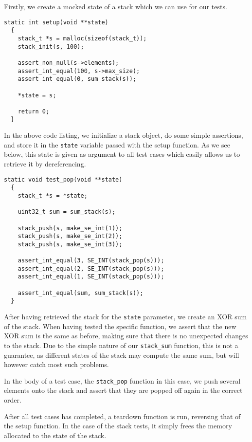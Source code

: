 Firstly, we create a mocked state of a stack which we can use for our tests.

\begin{lstlisting}[language={[ANSI]C},caption={Unit-test setup procedure}]
  static int setup(void **state)
  {
    stack_t *s = malloc(sizeof(stack_t));
    stack_init(s, 100);

    assert_non_null(s->elements);
    assert_int_equal(100, s->max_size);
    assert_int_equal(0, sum_stack(s));

    *state = s;

    return 0;
  }
\end{lstlisting}

In the above code listing, we initialize a stack object, do some simple
assertions, and store it in the {\tt state} variable passed with the setup
function. As we see below, this state is given as argument to all test cases
which easily allows us to retrieve it by dereferencing.

\begin{lstlisting}[language={[ANSI]C},caption={Unit-test of {\tt stack\_pop}}]
  static void test_pop(void **state)
  {
    stack_t *s = *state;

    uint32_t sum = sum_stack(s);

    stack_push(s, make_se_int(1));
    stack_push(s, make_se_int(2));
    stack_push(s, make_se_int(3));

    assert_int_equal(3, SE_INT(stack_pop(s)));
    assert_int_equal(2, SE_INT(stack_pop(s)));
    assert_int_equal(1, SE_INT(stack_pop(s)));

    assert_int_equal(sum, sum_stack(s));
  }
\end{lstlisting}

After having retrieved the stack for the {\tt state} parameter, we create an XOR
sum of the stack. When having tested the specific function, we assert that the
new XOR sum is the same as before, making sure that there is no unexpected
changes to the stack. Due to the simple nature of our {\tt stack\_sum} function,
this is not a guarantee, as different states of the stack may compute the same
sum, but will however catch most such problems.

In the body of a test case, the {\tt stack\_pop} function in this case, we push
several elements onto the stack and assert that they are popped off again in the
correct order.

After all test cases has completed, a teardown function is run, reversing that
of the setup function. In the case of the stack tests, it simply frees the
memory allocated to the state of the stack.

